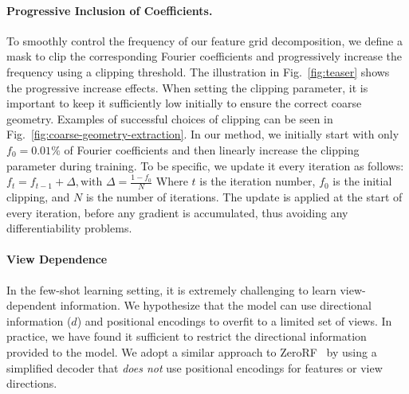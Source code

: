 \vspace{-1em}\paragraph{Progressive Inclusion of Coefficients.}
To smoothly control the frequency of our feature grid decomposition, we define a mask to clip the corresponding Fourier coefficients and progressively increase the frequency using a clipping threshold. 
The illustration in Fig.~\ref{fig:teaser} shows the progressive increase effects. 
When setting the clipping parameter, it is important to keep it sufficiently low initially to ensure the correct coarse geometry. Examples of successful choices of clipping can be seen in Fig.~\ref{fig:coarse-geometry-extraction}. 
In our method, we initially start with only $f_0=0.01\%$ of Fourier coefficients and then linearly increase the clipping parameter during training. To be specific, we update it every iteration as follows:
%
$
f_t = f_{t-1} + \Delta, \text{with } \Delta = \frac{1-f_0}{N}
$
%
Where $t$ is the iteration number, $f_0$ is the initial clipping, and $N$ is the number of iterations. The update is applied at the start of every iteration, before any gradient is accumulated, thus avoiding any differentiability problems.

\vspace{-1em}\paragraph{View Dependence}

In the few-shot learning setting, it is extremely challenging to learn view-dependent information. We hypothesize that the model can use directional information ($d$) and positional encodings to overfit to a limited set of views. In practice, we have found it sufficient to restrict the directional information provided to the model. We adopt a similar approach to ZeroRF~\cite{shi2024zerorf} by using a simplified decoder that \textit{does not} use positional encodings for features or view directions.


